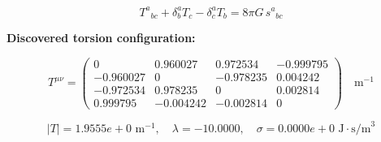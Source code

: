 
\begin{equation}
  T^a{}_{bc} + \delta^a_b T_c - \delta^a_c T_b = 8\pi G \, s^a{}_{bc}
\end{equation}

\textbf{Discovered torsion configuration:}

\begin{equation}
  T^{\mu\nu} = \begin{pmatrix}
    0 & 0.960027 & 0.972534 & -0.999795 \\
    -0.960027 & 0 & -0.978235 & 0.004242 \\
    -0.972534 & 0.978235 & 0 & 0.002814 \\
    0.999795 & -0.004242 & -0.002814 & 0
  \end{pmatrix} \quad \text{m}^{-1}
\end{equation}

\begin{equation}
  |T| = 1.9555e+0 \text{ m}^{-1}, \quad
  \lambda = -10.0000, \quad
  \sigma = 0.0000e+0 \text{ J}\cdot\text{s/m}^3
\end{equation}